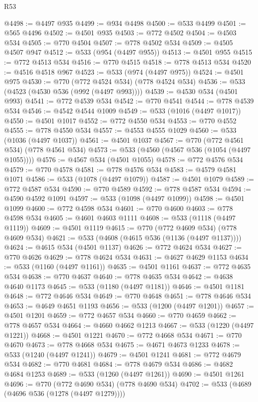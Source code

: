 \begin{lexlean}{R53}
\begin{coremodule}
@4498 := @4497 @935
@4499 := @934 @4498
@4500 := @533 @4499
@4501 := @565 @4496
@4502 := @4501 @935
@4503 := @772 @4502
@4504 := @4503 @534
@4505 := @770 @4504
@4507 := @778 @4502 @534
@4509 := @4505 @4507 @947
@4512 := @533 (@954 (@4497 @955))
@4513 := @4501 @955
@4515 := @772 @4513 @534
@4516 := @770 @4515
@4518 := @778 @4513 @534
@4520 := @4516 @4518 @967
@4523 := @533 (@974 (@4497 @975))
@4524 := @4501 @975
@4530 := @770 (@772 @4524 @534) (@778 @4524 @534)
@4536 := @533 (@4523 (@4530 @536 (@992 (@4497 @993))))
@4539 := @4530 @534 (@4501 @993)
@4541 := @772 @4539 @534
@4542 := @770 @4541
@4544 := @778 @4539 @534
@4546 := @4542 @4544 @1009
@4549 := @533 (@1016 (@4497 @1017))
@4550 := @4501 @1017
@4552 := @772 @4550 @534
@4553 := @770 @4552
@4555 := @778 @4550 @534
@4557 := @4553 @4555 @1029
@4560 := @533 (@1036 (@4497 @1037))
@4561 := @4501 @1037
@4567 := @770 (@772 @4561 @534) (@778 @4561 @534)
@4573 := @533 (@4560 (@4567 @536 (@1054 (@4497 @1055))))
@4576 := @4567 @534 (@4501 @1055)
@4578 := @772 @4576 @534
@4579 := @770 @4578
@4581 := @778 @4576 @534
@4583 := @4579 @4581 @1071
@4586 := @533 (@1078 (@4497 @1079))
@4587 := @4501 @1079
@4589 := @772 @4587 @534
@4590 := @770 @4589
@4592 := @778 @4587 @534
@4594 := @4590 @4592 @1091
@4597 := @533 (@1098 (@4497 @1099))
@4598 := @4501 @1099
@4600 := @772 @4598 @534
@4601 := @770 @4600
@4603 := @778 @4598 @534
@4605 := @4601 @4603 @1111
@4608 := @533 (@1118 (@4497 @1119))
@4609 := @4501 @1119
@4615 := @770 (@772 @4609 @534) (@778 @4609 @534)
@4621 := @533 (@4608 (@4615 @536 (@1136 (@4497 @1137))))
@4624 := @4615 @534 (@4501 @1137)
@4626 := @772 @4624 @534
@4627 := @770 @4626
@4629 := @778 @4624 @534
@4631 := @4627 @4629 @1153
@4634 := @533 (@1160 (@4497 @1161))
@4635 := @4501 @1161
@4637 := @772 @4635 @534
@4638 := @770 @4637
@4640 := @778 @4635 @534
@4642 := @4638 @4640 @1173
@4645 := @533 (@1180 (@4497 @1181))
@4646 := @4501 @1181
@4648 := @772 @4646 @534
@4649 := @770 @4648
@4651 := @778 @4646 @534
@4653 := @4649 @4651 @1193
@4656 := @533 (@1200 (@4497 @1201))
@4657 := @4501 @1201
@4659 := @772 @4657 @534
@4660 := @770 @4659
@4662 := @778 @4657 @534
@4664 := @4660 @4662 @1213
@4667 := @533 (@1220 (@4497 @1221))
@4668 := @4501 @1221
@4670 := @772 @4668 @534
@4671 := @770 @4670
@4673 := @778 @4668 @534
@4675 := @4671 @4673 @1233
@4678 := @533 (@1240 (@4497 @1241))
@4679 := @4501 @1241
@4681 := @772 @4679 @534
@4682 := @770 @4681
@4684 := @778 @4679 @534
@4686 := @4682 @4684 @1253
@4689 := @533 (@1260 (@4497 @1261))
@4690 := @4501 @1261
@4696 := @770 (@772 @4690 @534) (@778 @4690 @534)
@4702 := @533 (@4689 (@4696 @536 (@1278 (@4497 @1279))))

\end{coremodule}
\end{lexlean}
